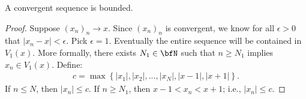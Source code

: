     \begin{proposition}\label{prop:conv-seq-bounded}
        A convergent sequence is bounded.
    \end{proposition}
        \begin{proof}
            Suppose $(x_n)_n \rightarrow x$. Since $(x_n)_n$ is convergent, we know for all $\epsilon > 0$ that $|x_n - x| < \epsilon$. Pick $\epsilon = 1$. Eventually the entire sequence will be contained in $V_1(x)$. More formally, there exists $N_1 \in \bfN$ such that $n \geq N_1$ implies $x_n \in V_1(x)$. Define:
                \begin{equation*}
                \begin{split}
                    c = \max \left\{|x_1|,|x_2|,...,|x_N|,|x-1|,|x+1|\right\}.
                \end{split}
                \end{equation*}
            If $n \leq N$, then $|x_n| \leq c$. If $n \geq N_1$, then $x-1 < x_n < x+1$; i.e., $|x_n| \leq c$.
        \end{proof}

